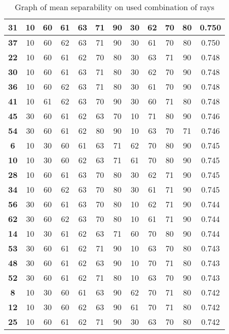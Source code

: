 \begin{table}
\begin{tabular}{|c|c|c|c|c|c|c|c|c|c|c|c|}
\hline
\textbf{31} & 10 & 60 & 61 & 63 & 71 & 90 & 30 & 62 & 70 & 80 & 0.750 \\
\hline
\textbf{37} & 10 & 60 & 62 & 63 & 71 & 90 & 30 & 61 & 70 & 80 & 0.750 \\
\hline
\textbf{22} & 10 & 60 & 61 & 62 & 70 & 80 & 30 & 63 & 71 & 90 & 0.748 \\
\hline
\textbf{30} & 10 & 60 & 61 & 63 & 71 & 80 & 30 & 62 & 70 & 90 & 0.748 \\
\hline
\textbf{36} & 10 & 60 & 62 & 63 & 71 & 80 & 30 & 61 & 70 & 90 & 0.748 \\
\hline
\textbf{41} & 10 & 61 & 62 & 63 & 70 & 90 & 30 & 60 & 71 & 80 & 0.748 \\
\hline
\textbf{45} & 30 & 60 & 61 & 62 & 63 & 70 & 10 & 71 & 80 & 90 & 0.746 \\
\hline
\textbf{54} & 30 & 60 & 61 & 62 & 80 & 90 & 10 & 63 & 70 & 71 & 0.746 \\
\hline
\textbf{6} & 10 & 30 & 60 & 61 & 63 & 71 & 62 & 70 & 80 & 90 & 0.745 \\
\hline
\textbf{10} & 10 & 30 & 60 & 62 & 63 & 71 & 61 & 70 & 80 & 90 & 0.745 \\
\hline
\textbf{28} & 10 & 60 & 61 & 63 & 70 & 80 & 30 & 62 & 71 & 90 & 0.745 \\
\hline
\textbf{34} & 10 & 60 & 62 & 63 & 70 & 80 & 30 & 61 & 71 & 90 & 0.745 \\
\hline
\textbf{56} & 30 & 60 & 61 & 63 & 70 & 80 & 10 & 62 & 71 & 90 & 0.744 \\
\hline
\textbf{62} & 30 & 60 & 62 & 63 & 70 & 80 & 10 & 61 & 71 & 90 & 0.744 \\
\hline
\textbf{14} & 10 & 30 & 61 & 62 & 63 & 71 & 60 & 70 & 80 & 90 & 0.744 \\
\hline
\textbf{53} & 30 & 60 & 61 & 62 & 71 & 90 & 10 & 63 & 70 & 80 & 0.743 \\
\hline
\textbf{48} & 30 & 60 & 61 & 62 & 63 & 90 & 10 & 70 & 71 & 80 & 0.743 \\
\hline
\textbf{52} & 30 & 60 & 61 & 62 & 71 & 80 & 10 & 63 & 70 & 90 & 0.743 \\
\hline
\textbf{8} & 10 & 30 & 60 & 61 & 63 & 90 & 62 & 70 & 71 & 80 & 0.742 \\
\hline
\textbf{12} & 10 & 30 & 60 & 62 & 63 & 90 & 61 & 70 & 71 & 80 & 0.742 \\
\hline
\textbf{25} & 10 & 60 & 61 & 62 & 71 & 90 & 30 & 63 & 70 & 80 & 0.742 \\
\hline
\end{tabular}
\caption{Graph of mean separability on used combination of rays}
\label{table:MeanSeperability}
\end{table}

